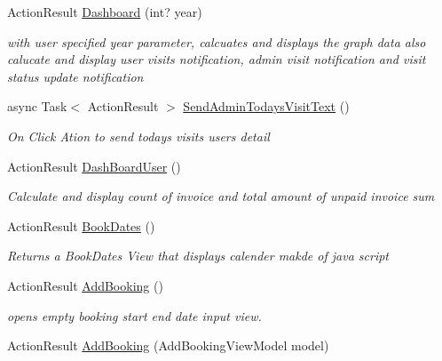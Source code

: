 \begin{DoxyCompactItemize}
\item 
Action\+Result \hyperlink{class_alfa_accounting_1_1_controllers_1_1_booking_view_models_controller_a5264795f04c49fa720e00514b644b57d}{Dashboard} (int? year)
\begin{DoxyCompactList}\small\item\em with user specified year parameter, calcuates and displays the graph data also calucate and display user visits notification, admin visit notification and visit status update notification \end{DoxyCompactList}\item 
async Task$<$ Action\+Result $>$ \hyperlink{class_alfa_accounting_1_1_controllers_1_1_booking_view_models_controller_a560b40cc15d83dc780c485d678e3e68c}{Send\+Admin\+Todays\+Visit\+Text} ()
\begin{DoxyCompactList}\small\item\em On Click Ation to send todays visit\textquotesingle{}s users detail \end{DoxyCompactList}\item 
Action\+Result \hyperlink{class_alfa_accounting_1_1_controllers_1_1_booking_view_models_controller_aab2da8319a9b49c4dd060b669e230552}{Dash\+Board\+User} ()
\begin{DoxyCompactList}\small\item\em Calculate and display count of invoice and total amount of unpaid invoice sum \end{DoxyCompactList}\item 
Action\+Result \hyperlink{class_alfa_accounting_1_1_controllers_1_1_booking_view_models_controller_a1fa97ecedb9b4faaec9e994bfce18eb3}{Book\+Dates} ()
\begin{DoxyCompactList}\small\item\em Returns a Book\+Dates View that displays calender makde of java script \end{DoxyCompactList}\item 
Action\+Result \hyperlink{class_alfa_accounting_1_1_controllers_1_1_booking_view_models_controller_a5c17315b4daf73640327bfefa8b34ad7}{Add\+Booking} ()
\begin{DoxyCompactList}\small\item\em opens empty booking start end date input view. \end{DoxyCompactList}\item 
Action\+Result \hyperlink{class_alfa_accounting_1_1_controllers_1_1_booking_view_models_controller_a26b7e355b83aa0974f8b3a42c3096924}{Add\+Booking} (Add\+Booking\+View\+Model model)

\end{DoxyCompactItemize}
